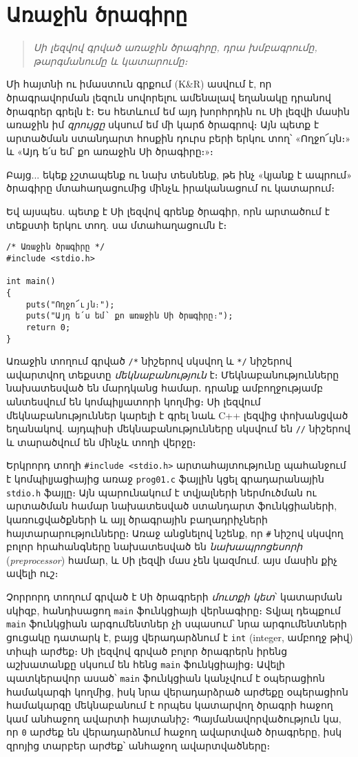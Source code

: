 \chapter{Առաջին ծրագիրը}

\begin{quote}
\emph{Սի լեզվով գրված առաջին ծրագիրը, դրա խմբագրումը, թարգմանումը և կատարումը։}
\end{quote}

Մի հայտնի ու իմաստուն գրքում (K\&R) ասվում է, որ ծրագրավորման լեզուն սովորելու ամենալավ եղանակը դրանով ծրագրեր գրելն է։ Ես հետևում եմ այդ խորհրդին ու Սի լեզվի մասին առաջին իմ \emph{զրույցը} սկսում եմ մի կարճ ծրագրով։ Այն պետք է արտածման ստանդարտ հոսքին դուրս բերի երկու տող՝ «Ողջո՜ւյն։» և «Այդ ե՛ս եմ՝ քո առաջին Սի ծրագիրը։»։

Բայց... եկեք չշտապենք ու նախ տեսնենք, թե ինչ «կյանք է ապրում» ծրագիրը մտահաղացումից մինչև իրականացում ու կատարում։

Եվ այսպես. պետք է Սի լեզվով գրենք ծրագիր, որն արտածում է տեքստի երկու տող. սա մտահաղացումն է։

\begin{verbatim}
/* Առաջին ծրագիրը */
#include <stdio.h>

int main()
{
    puts("Ողջո՜ւյն։");
    puts("Այդ ե՛ս եմ՝ քո առաջին Սի ծրագիրը։");
    return 0;
}
\end{verbatim}

Առաջին տողում գրված \verb|/*| նիշերով սկսվող և \verb|*/| նիշերով ավարտվող տեքստը \emph{մեկնաբանություն} է։ Մեկնաբանությունները նախատեսված են մարդկանց համար․ դրանք ամբողջությամբ անտեսվում են կոմպիլյատորի կողմից։ Սի լեզվում մեկնաբանություններ կարելի է գրել նաև C++ լեզվից փոխանցված եղանակով. այդպիսի մեկնաբանությունները սկսվում են \verb|//| նիշերով և տարածվում են մինչև տողի վերջը։

Երկրորդ տողի \verb|#include <stdio.h>| արտահայտությունը պահանջում է կոմպիլյացիայից առաջ \texttt{prog01.c} ֆայլին կցել գրադարանային \texttt{stdio.h} ֆայլը։ Այն պարունակում է տվյալների ներմուծման ու արտածման համար նախատեսված ստանդարտ ֆունկցիաների, կառուցվածքների և այլ ծրագրային բաղադրիչների հայտարարությունները։ Առաջ անցնելով նշենք, որ \verb|#| նիշով սկսվող բոլոր հրահանգները նախատեսված են \emph{նախապրոցեսորի} (\emph{preprocessor}) համար, և Սի լեզվի մաս չեն կազմում. այս մասին քիչ ավելի ուշ։

Չորրորդ տողում գրված է Սի ծրագրերի \emph{մուտքի կետ}՝ կատարման սկիզբ, հանդիսացող \texttt{main} ֆունկցիայի վերնագիրը։ Տվյալ դեպքում \texttt{main} ֆունկցիան արգումենտներ չի սպասում՝ նրա արգումենտների ցուցակը դատարկ է, բայց վերադարձնում է \texttt{int} (integer, ամբողջ թիվ) տիպի արժեք։ Սի լեզվով գրված բոլոր ծրագրերն իրենց աշխատանքը սկսում են հենց \texttt{main} ֆունկցիայից։ Ավելի պատկերավոր ասած՝ \texttt{main} ֆունկցիան կանչվում է օպերացիոն համակարգի կողմից, իսկ նրա վերադարձրած արժեքը օպերացիոն համակարգը մեկնաբանում է որպես կատարվող ծրագրի հաջող կամ անհաջող ավարտի հայտանիշ։ Պայմանավորվածություն կա, որ \texttt{0} արժեք են վերադարձնում հաջող ավարտված ծրագրերը, իսկ զրոյից տարբեր արժեք՝ անհաջող ավարտվածները։

